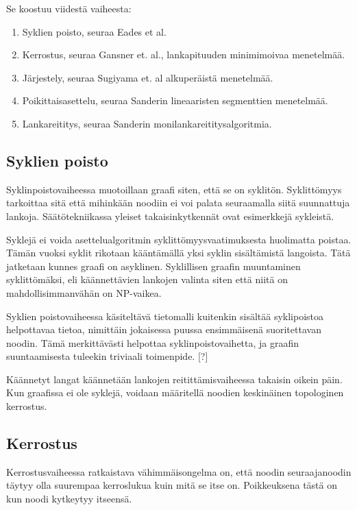 \documentclass[finnish,12pt]{article}
\begin{document}
Se koostuu viidestä vaiheesta:
\begin{enumerate}
  \item Syklien poisto, seuraa Eades et al.\cite{RefWorks:48}
  \item Kerrostus, seuraa Gansner et. al., lankapituuden minimimoivaa menetelmää. \cite{RefWorks:28}
  \item Järjestely, seuraa Sugiyama et. al alkuperäistä menetelmää. \cite{RefWorks:9}
  \item Poikittaisasettelu, seuraa Sanderin lineaaristen segmenttien menetelmää. \cite{RefWorks:49}
  \item Lankareititys, seuraa Sanderin monilankareititysalgoritmia. \cite{RefWorks:17}
\end{enumerate}

		\subsection{Syklien poisto}

Syklinpoistovaiheessa muotoillaan graafi siten, että se on syklitön.
Syklittömyys tarkoittaa sitä että mihinkään noodiin ei voi palata seuraamalla siitä suunnattuja lankoja.
Säätötekniikassa yleiset takaisinkytkennät ovat esimerkkejä sykleistä.

Syklejä ei voida asettelualgoritmin syklittömyysvaatimuksesta huolimatta poistaa.
Tämän vuoksi syklit rikotaan kääntämällä yksi syklin sisältämistä langoista.
Tätä jatketaan kunnes graafi on asyklinen.
Syklillisen graafin muuntaminen syklittömäksi, eli käännettävien lankojen valinta siten että niitä on mahdollisimmanvähän on NP-vaikea.

Syklien poistovaiheessa käsiteltävä tietomalli kuitenkin sisältää syklipoistoa helpottavaa tietoa, nimittäin jokaisessa puussa ensimmäisenä suoritettavan noodin. Tämä merkittävästi helpottaa syklinpoistovaihetta, ja graafin suuntaamisesta tuleekin triviaali toimenpide. [?]

Käännetyt langat käännetään lankojen reitittämisvaiheessa takaisin oikein päin.
Kun graafissa ei ole syklejä, voidaan määritellä noodien keskinäinen topologinen kerrostus.

		\subsection{Kerrostus}

Kerrostusvaiheessa ratkaistava vähimmäisongelma on, että noodin seuraajanoodin täytyy olla suurempaa kerroslukua kuin mitä se itse on. Poikkeuksena tästä on kun noodi kytkeytyy itseensä.
\end{document}
